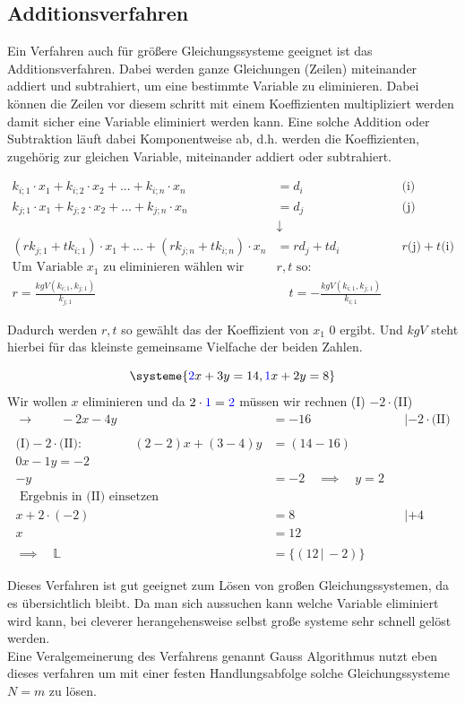 \documentclass[a4paper,12pt]{article}
\newcommand{\Redbox}[1]{
	{
		\vspace*{0.1cm}
		\begin{tcolorbox}[breakable,colback=yellow!0,colframe=red!65!black,width=\linewidth ]
			{#1}
		\end{tcolorbox}
		
		
	}
}
\newcommand{\Beispiel}[1]{
	\vspace*{0.2cm}
	\begin{tcolorbox}[breakable,colback=yellow!0,colframe=green!65!black,title=\textbf{Beispiel:},width=\linewidth ]
		{#1}
	\end{tcolorbox}
}
\begin{document}
	\subsection{Additionsverfahren}
	Ein Verfahren auch für größere Gleichungssysteme geeignet ist das Additionsverfahren. Dabei werden ganze Gleichungen (Zeilen) miteinander addiert und subtrahiert, um eine bestimmte Variable zu eliminieren. Dabei können die Zeilen vor diesem schritt mit einem Koeffizienten multipliziert werden damit sicher eine Variable eliminiert werden kann. Eine solche Addition oder Subtraktion läuft dabei Komponentweise ab, d.h. werden die Koeffizienten, zugehörig zur gleichen Variable, miteinander addiert oder subtrahiert.
	\Redbox{
		\begin{align*}
				k_{i;1}\cdot x_1 + k_{i;2}\cdot x_2+ ... + k_{i;n}\cdot x_n 	&=d_i&&\text{(i)}\\
				k_{j;1}\cdot x_1 + k_{j;2}\cdot x_2+ ... + k_{j;n}\cdot x_n 	&=d_j&&\text{(j)}\\
				&\downarrow\\
				(r k_{j;1} + t k_{i;1})\cdot x_1 +  ... + (r k_{j;n} + tk_{i;n})\cdot x_n 	&=r d_j + td_i &&r\text{(j)} +t\text{(i)}\\
				\text{Um Variable }x_1\text{ zu eliminieren wählen wir } &r,t\text{ so}:\\
				r=\frac{kgV(k_{i;1},k_{j;1})}{k_{j;1}}\quad & \quad t=-\frac{kgV(k_{i;1},k_{j;1})}{k_{i;1}}
		\end{align*}
	}
Dadurch werden $r,t$ so gewählt das der Koeffizient von $x_1$ 0 ergibt. Und $kgV$ steht hierbei für das kleinste gemeinsame Vielfache der beiden Zahlen.\\
\Beispiel{
	\[\systeme{
		\color{blue}2\color{black}x + 3y = 14,
		\color{blue}1\color{black}x + 2y = 8
	}\]
	Wir wollen $x$ eliminieren und da  $2 \cdot \color{blue}1\color{black} = \color{blue}2\color{black}$ müssen wir rechnen (I) $- 2\cdot $(II)
	\begin{align*}
		\rightarrow\qquad  - 2x - 4y &= -16 &&| -2\cdot \text{(II)}\\\\
		\text{(I)} - 2\cdot\text{(II)}:\qquad \qquad (2-2)x + (3-4)y&= (14 - 16)\\
		0x - 1y = -2\\
													-y&=-2 \quad\implies\quad y=2\\
													\text{ Ergebnis in (II) einsetzen}&\\
													x+ 2\cdot(-2)&=8&&|+4\\
													x&=12\\\\
													\implies \quad \mathds{L}&=\{(12\,|\,-2)\}												 
	\end{align*}
	}
	Dieses Verfahren ist gut geeignet zum Lösen von großen Gleichungssystemen, da es übersichtlich bleibt. Da man sich aussuchen kann welche Variable eliminiert wird kann, bei cleverer herangehensweise selbst große systeme sehr schnell gelöst werden.\\
	Eine Veralgemeinerung des Verfahrens genannt Gauss Algorithmus nutzt eben dieses verfahren um mit einer festen Handlungsabfolge solche Gleichungssysteme $N=m$ zu lösen.
\end{document}

